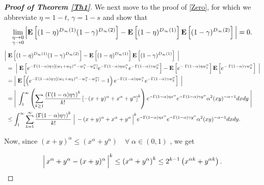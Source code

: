 \documentclass[11pt, reqno]{amsart}
\numberwithin{equation}{section}
\theoremstyle{plain} %
\theoremstyle{definition} %
\newcommand{\E}{\mathbf{E}}
\begin{document}
\begin{proof}[{\bf Proof of Theorem \ref{Th1}}]
We next move to the proof of \eqref{Zero}, for which we abbreviate  $\eta = 1-t$, $\gamma=1-s$ and show that
$$\lim_{\substack{ \eta\to 0\\ \gamma \to 0}}\Big{\lvert}  \E\left[ (1-\eta)^{D_\infty(1)} (1-\gamma)^{D_\infty(2)}  \right] -  \E\left[ (1-\eta)^{D_\infty(1)}\right]\E \left[(1-\gamma)^{D_{\infty}(2)}   \right]\Big{\rvert}=0.$$
\begin{equation}
\begin{split}
     \Big{\lvert} & \; \E\left[ (1-\eta)^{D_\infty(1)} (1-\gamma)^{D_\infty(2)}  \right] -  \E \left[ (1-\eta)^{D_\infty(1)}\right] \E \left[(1-\gamma)^{D_\infty(1)}   \right]   \; \Big{\rvert} \\
    & =  \; \Big{\lvert}\;  \mathbf{E} \left[    e^{-   \Gamma(1-\alpha) \eta \gamma  \left[ (w_1 + w_2)^{\alpha} - w_1^{\alpha} - w_2^{\alpha} \right]}   e^{-   \Gamma(1-\alpha) \eta w_1^{\alpha}} e^{-    \Gamma(1-\alpha) \gamma w_2^{\alpha}}   \right]  -  \mathbf{E} \left[ e^{-  \;  \Gamma(1-\alpha) \eta w_1^{\alpha}} \right] \mathbf{E} \left[ e^{-  \;  \Gamma(1-\alpha) \gamma w_2^{\alpha}}   \right]  \;  \Big{\rvert} \\ 
    &=  \Big{\lvert}\; \mathbf{E} \left[ \left( e^{-  \Gamma(1-\alpha) \eta\gamma  \left[ (w_1 + w_2)^{\alpha} - w_1^{\alpha} - w_2^{\alpha} \right]} -1  \right)   e^{-  \Gamma(1-\alpha) \eta w_1^{\alpha}} e^{- \Gamma(1-\alpha) \gamma w_2^{\alpha}}   \right] \;\Big{\rvert}\\
    &=  \Bigg{\lvert}\; \int^{\infty}_{1} \left( \sum_{k\geq 1} \frac{\left(   \Gamma(1-\alpha) \eta \gamma \right)^k}{k!} \left[ -(x+y)^{\alpha} + x^{\alpha} + y^{\alpha} \right]^k \right)   e^{-   \Gamma(1-\alpha) \eta x^{\alpha}} e^{-   \Gamma(1-\alpha) \gamma y^{\alpha}}   \alpha^2(xy)^{-\alpha -1} dx dy \;\Bigg{\rvert} \\
    &\leq \int^{\infty}_{1}   \sum_{k = 1}^{\infty} \frac{\left(   \Gamma(1-\alpha) \eta \gamma \right)^k}{k!} \; \Big{\lvert}\, -(x+y)^{\alpha} + x^{\alpha} + y^{\alpha}  \,\Big{\rvert}^k     e^{-    \Gamma(1-\alpha) \eta x^{\alpha}} e^{-   \Gamma(1-\alpha) \gamma y^{\alpha}} \alpha ^2 (xy)^{-\alpha -1} dx dy.
\end{split}
\end{equation}

Now, since $ (x+y)^{\alpha} \leq (x^{\alpha} + y^{\alpha}) \quad \forall \; \alpha \in (0,1)$ , we get

\begin{equation} \label{eq:positivity}
   \Big{\lvert}\,  x^{\alpha} + y^{\alpha} -(x+y)^{\alpha}  \,\Big{\rvert}^k  \leq \left(  x^{\alpha} + y^{\alpha}  \right)^k \leq 2^{k-1} \left(
   x^{\alpha k} + y^{\alpha k} \right).
\end{equation}



\end{proof}
\end{document}
